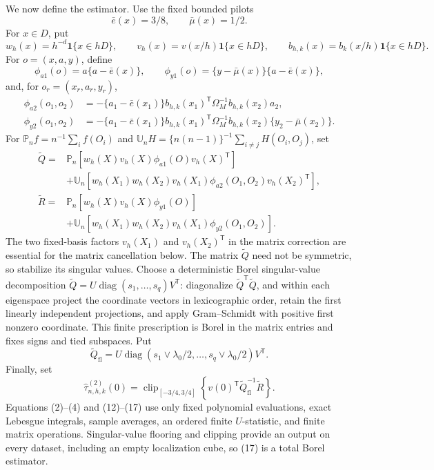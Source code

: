 We now define the estimator.  Use the fixed bounded pilots
\[
 \bar e(x)=3/8,
 \qquad \bar\mu(x)=1/2.
 \tag{12}
\]
For \(x\in D\), put
\[
 w_h(x)=h^{-d}\mathbf1\{x\in hD\},\qquad
 v_h(x)=v(x/h)\mathbf1\{x\in hD\},\qquad
 b_{h,k}(x)=b_k(x/h)\mathbf1\{x\in hD\}.
\]
For \(o=(x,a,y)\), define
\[
 \phi_{a1}(o)=a\{a-\bar e(x)\},
 \qquad
 \phi_{y1}(o)=\{y-\bar\mu(x)\}\{a-\bar e(x)\},
 \tag{13}
\]
and, for \(o_r=(x_r,a_r,y_r)\),
\[
 \begin{split}
 \phi_{a2}(o_1,o_2)
 &=-\{a_1-\bar e(x_1)\}
 b_{h,k}(x_1)^{\mathsf T}\Omega_M^{-1}b_{h,k}(x_2)a_2,\\
 \phi_{y2}(o_1,o_2)
 &=-\{a_1-\bar e(x_1)\}
 b_{h,k}(x_1)^{\mathsf T}\Omega_M^{-1}b_{h,k}(x_2)
 \{y_2-\bar\mu(x_2)\}.
 \end{split}
 \tag{14}
\]
For \(\mathbb P_n f=n^{-1}\sum_i f(O_i)\) and \(\mathbb U_nH=\{n(n-1)\}^{-1}\sum_{i\ne j}H(O_i,O_j)\), set
\[
 \begin{split}
 \widetilde Q={}&\mathbb P_n\!\left[
 w_h(X)v_h(X)\phi_{a1}(O)v_h(X)^{\mathsf T}\right]\\
 &+\mathbb U_n\!\left[
 w_h(X_1)w_h(X_2)v_h(X_1)\phi_{a2}(O_1,O_2)v_h(X_2)^{\mathsf T}\right],\\
 \widetilde R={}&\mathbb P_n\!\left[
 w_h(X)v_h(X)\phi_{y1}(O)\right]\\
 &+\mathbb U_n\!\left[
 w_h(X_1)w_h(X_2)v_h(X_1)\phi_{y2}(O_1,O_2)\right].
 \end{split}
 \tag{15}
\]
The two fixed-basis factors \(v_h(X_1)\) and \(v_h(X_2)^{\mathsf T}\) in the matrix correction are essential for the matrix cancellation below.  The matrix \(\widetilde Q\) need not be symmetric, so stabilize its singular values.  Choose a deterministic Borel singular-value decomposition \(\widetilde Q=U\operatorname{diag}(s_1,\ldots,s_q)V^{\mathsf T}\): diagonalize \(\widetilde Q^{\mathsf T}\widetilde Q\), and within each eigenspace project the coordinate vectors in lexicographic order, retain the first linearly independent projections, and apply Gram--Schmidt with positive first nonzero coordinate.  This finite prescription is Borel in the matrix entries and fixes signs and tied subspaces.  Put
\[
 \widetilde Q_{\mathrm{fl}}
 =U\operatorname{diag}(s_1\vee\lambda_0/2,\ldots,s_q\vee\lambda_0/2)V^{\mathsf T}.
 \tag{16}
\]
Finally, set
\[
 \widehat\tau^{(2)}_{n,h,k}(0)
 =\operatorname{clip}_{[-3/4,3/4]}
 \left\{v(0)^{\mathsf T}\widetilde Q_{\mathrm{fl}}^{-1}\widetilde R\right\}.
 \tag{17}
\]
Equations (2)--(4) and (12)--(17) use only fixed polynomial evaluations, exact Lebesgue integrals, sample averages, an ordered finite \(U\)-statistic, and finite matrix operations.  Singular-value flooring and clipping provide an output on every dataset, including an empty localization cube, so (17) is a total Borel estimator.

